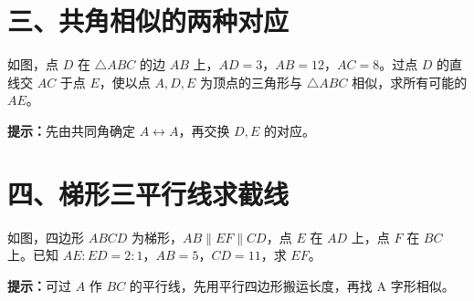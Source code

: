 \documentclass{exam-zh}
\begin{document}
\section*{三、共角相似的两种对应}


\begin{problem}[points=10]
  \noindent
  \begin{minipage}[t]{\dimexpr\linewidth-60mm-6mm\relax}
    \vspace{0pt}
    如图，点 $D$ 在 $\triangle ABC$ 的边 $AB$ 上，$AD=3$，$AB=12$，$AC=8$。过点 $D$ 的直线交 $AC$ 于点 $E$，使以点 $A,D,E$ 为顶点的三角形与 $\triangle ABC$ 相似，求所有可能的 $AE$。

    \begin{hintbox}
\textbf{提示：}先由共同角确定 $A\leftrightarrow A$，再交换 $D,E$ 的对应。\end{hintbox}

  \end{minipage}\hfill
  \begin{diagramcoltikz}{60mm}{先锁定共同角 $A$，再分类讨论另外两个顶点的对应。}
  }
  \end{diagramcoltikz}
  \par\medskip
  \answerarea[62mm]
\end{problem}


\section*{四、梯形三平行线求截线}


\begin{problem}[points=10]
  \noindent
  \begin{minipage}[t]{\dimexpr\linewidth-60mm-6mm\relax}
    \vspace{0pt}
    如图，四边形 $ABCD$ 为梯形，$AB\parallel EF\parallel CD$，点 $E$ 在 $AD$ 上，点 $F$ 在 $BC$ 上。已知 $AE:ED=2:1$，$AB=5$，$CD=11$，求 $EF$。

    \begin{hintbox}
\textbf{提示：}可过 $A$ 作 $BC$ 的平行线，先用平行四边形搬运长度，再找 A 字形相似。\end{hintbox}

  \end{minipage}\hfill
  \begin{diagramcoltikz}{60mm}{三条平行线把两条腰按同一比例分割。}
  }
  \end{diagramcoltikz}
  \par\medskip
  \answerarea[60mm]
\end{problem}
\end{document}
